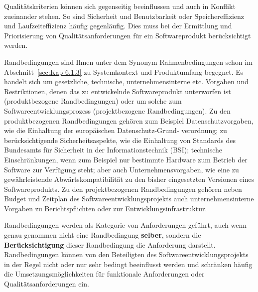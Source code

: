 Qualitätskriterien können sich gegenseitig beeinflussen und auch in Konflikt zuei\-nan\-der stehen. So sind Sicherheit und Benutzbarkeit oder Speichereffizienz und Laufzeiteffizienz häufig gegenläufig. Dies muss bei der Ermittlung und Priorisierung von Qualitätsanforderungen für ein Softwareprodukt berücksichtigt werden.


Randbedingungen sind Ihnen unter dem Synonym Rahmenbedingungen schon im Abschnitt~\ref{sec:Kap-6.1.3} zu Systemkontext und Produktumfang begegnet. Es handelt sich um gesetzliche, technische, unternehmensinterne etc. Vorgaben und Restriktionen, denen das zu entwickelnde Softwareprodukt unterworfen ist (produktbezogene Randbedingungen) oder um solche zum Softwareentwicklungsprozess (projektbezogene Randbedingungen). Zu den produktbezogenen Randbedingungen gehören zum Beispiel Datenschutzvorgaben, wie die Einhaltung der europäischen Datenschutz-Grund-
\linebreak %
verordnung; zu berücksichtigende Sicherheitsaspekte, wie die Einhaltung von Standards des Bundesamts für Sicherheit in der Informationstechnik (BSI); technische Einschränkungen, wenn zum Beispiel nur bestimmte Hardware zum Betrieb der Software zur Verfügung steht; aber auch Unternehmensvorgaben, wie \zb eine zu gewährleistende Abwärtskompatibilität zu den bisher eingesetzten Versionen eines Softwareprodukts. Zu den projektbezogenen Randbedingungen gehören neben Budget und Zeitplan des Softwareentwicklungsprojekts auch unternehmensinterne Vorgaben zu Berichtspflichten oder zur Entwicklungsinfrastruktur.

Randbedingungen werden als Kategorie von Anforderungen geführt, auch wenn genau genommen nicht eine Randbedingung \textbf{selber}, sondern die \textbf{Berücksichtigung} dieser Randbedingung die Anforderung darstellt. Randbedingungen können von den Beteiligten des Softwareentwicklungsprojekts in der Regel nicht oder nur sehr bedingt beeinflusst werden und schränken häufig die Umsetzungsmöglichkeiten für funktionale Anforderungen oder Qualitätsanforderungen ein.

\vspace{2mm} %


